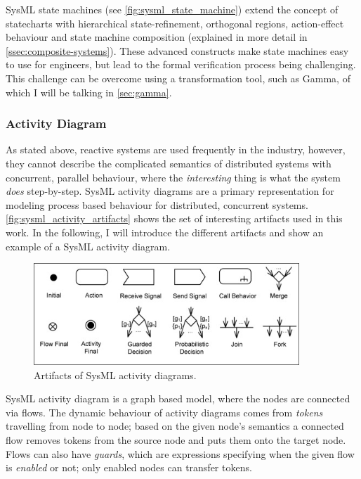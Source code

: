 SysML state machines (see \ref{fig:sysml_state_machine}) extend the concept of statecharts with hierarchical state-refinement, orthogonal regions, action-effect behaviour and state machine composition (explained in more detail in \autoref{ssec:composite-systems}). These advanced constructs make state machines easy to use for engineers, but lead to the formal verification process being challenging. This challenge can be overcome using a transformation tool, such as Gamma, of which I will be talking in \autoref{sec:gamma}.

\subsubsection{Activity Diagram}\label{ssec:sysml_activity}

As stated above, reactive systems are used frequently in the industry, however, they cannot describe the complicated semantics of distributed systems with concurrent, parallel behaviour, where the \emph{interesting} thing is what the system \emph{does} step-by-step. SysML activity diagrams are a primary representation for modeling process based behaviour\cite{omg_sysml} for distributed, concurrent systems. \autoref{fig:sysml_activity_artifacts} shows the set of interesting artifacts used in this work. In the following, I will introduce the different artifacts and show an example of a SysML activity diagram.

\begin{figure}[!ht]
	\centering
	\includegraphics[width=100mm, keepaspectratio]{figures/sysml_activity_artifacts.png}\hspace{1cm}
	\caption{Artifacts of SysML activity diagrams.}
	\label{fig:sysml_activity_artifacts}
\end{figure}

SysML activity diagram is a graph based model, where the nodes are connected via flows. The dynamic behaviour of activity diagrams comes from \emph{tokens} travelling from node to node; based on the given node's semantics a connected flow removes tokens from the source node and puts them onto the target node. Flows can also have \emph{guards}, which are expressions specifying when the given flow is \emph{enabled} or not; only enabled nodes can transfer tokens.

